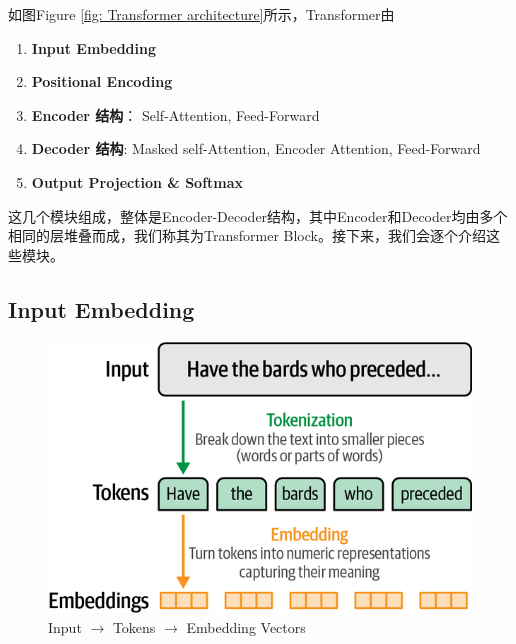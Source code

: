 \clearpage
如图Figure \ref{fig: Transformer architecture}所示，Transformer由
\begin{enumerate}
  \item \textbf{Input Embedding}
  \item \textbf{Positional Encoding}
  \item \textbf{Encoder 结构}： Self-Attention, Feed-Forward
  \item \textbf{Decoder 结构}: Masked self-Attention, Encoder Attention, Feed-Forward
  \item \textbf{Output Projection \& Softmax}
\end{enumerate}
这几个模块组成，整体是Encoder-Decoder结构，其中Encoder和Decoder均由多个相同的层堆叠而成，我们称其为Transformer Block。接下来，我们会逐个介绍这些模块。

\clearpage

{\chaptoc\noindent
\begin{minipage}[inner sep=0,outer sep=0]{0.9\linewidth}
  \subsection{Input Embedding}
\end{minipage}}


\begin{figure}[htbp]
  \centering
  \includegraphics[width=0.5\linewidth]{figs/lec2/lec2.02.png}
  \caption{Input $\xrightarrow{}$ Tokens $\xrightarrow{}$ Embedding Vectors}
  \label{fig:Input Embedding Box}
\end{figure}

